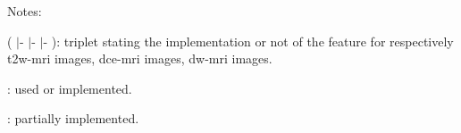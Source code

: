 \begin{table}
\begin{threeparttable}
\begin{tabular}{p{.5\linewidth} p{.4\linewidth}}
      \hline
    \end{tabular}
    \begin{tablenotes}
      \footnotesize
    \item Notes:
    \item ( {\cmarksmall}$|$- {\cmarksmall}$|$- {\cmarksmall}$|$- ): triplet stating the implementation or not of the feature for respectively \ac{t2w}-\ac{mri} images, \ac{dce}-\ac{mri} images, \ac{dw}-\ac{mri} images.
    \item {\cmarksmall}: used or implemented.
    \item {\mmarksmall}: partially implemented.
    \end{tablenotes}
  \end{threeparttable}
\end{table}
\restoregeometry

